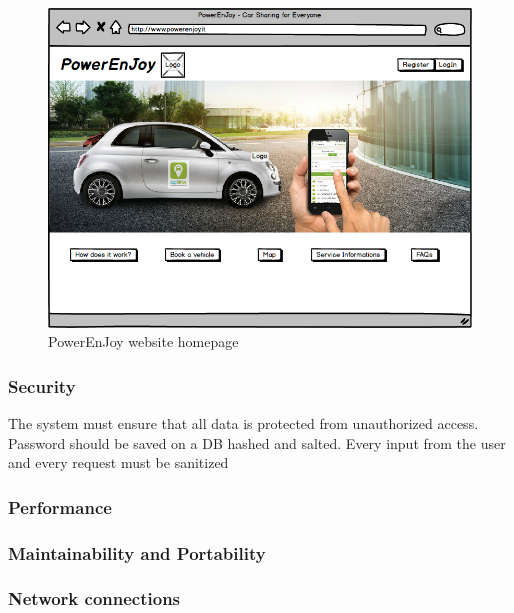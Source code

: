 \documentclass[english]{article}
\begin{document}
\begin{itemize}
\begin{itemize}
\begin{figure}[h]
	\centering
\includegraphics[scale=0.4]{img/webhome}
	\caption{PowerEnJoy website homepage}
\end{figure}
\FloatBarrier



\subsubsection{Security}

The system must ensure that all data is protected from unauthorized
access. Password should be saved on a DB hashed and salted.
Every input from the user and every request must be sanitized 

\end{itemize}

\pagebreak{}




\subsubsection{Performance}


\subsubsection{Maintainability and Portability}




\subsubsection{Network connections}



\end{itemize}
\end{document}
